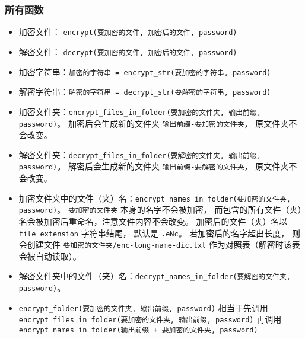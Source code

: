 \subsubsection{所有函数}
\begin{itemize}
\item 加密文件： \verb`encrypt(要加密的文件, 加密后的文件, password)`
\item 解密文件： \verb`decrypt(要加密的文件, 加密后的文件, password)`
\item 加密字符串：\verb`加密的字符串 = encrypt_str(要加密的字符串, password)`
\item 解密字符串：\verb`解密的字符串 = decrypt_str(要解密的字符串, password)`
\item 加密文件夹：\verb`encrypt_files_in_folder(要加密的文件夹, 输出前缀, password)`。 加密后会生成新的文件夹 \verb`输出前缀-要加密的文件夹`， 原文件夹不会改变。
\item 解密文件夹：\verb`decrypt_files_in_folder(要解密的文件夹, 输出前缀, password)`。 解密后会生成新的文件夹 \verb`输出前缀-要解密的文件夹`， 原文件夹不会改变。
\item 加密文件夹中的文件（夹）名：\verb`encrypt_names_in_folder(要加密的文件夹, password)`。 \verb`要加密的文件夹` 本身的名字不会被加密， 而包含的所有文件（夹）名会被加密后重命名，注意文件内容不会改变。 加密后的文件（夹）名以 \verb`file_extension` 字符串结尾， 默认是 \verb`.eNc`。 若加密后的名字超出长度， 则会创建文件 \verb`要加密的文件夹/enc-long-name-dic.txt` 作为对照表（解密时该表会被自动读取）。
\item 解密文件夹中的文件（夹）名：\verb`decrypt_names_in_folder(要解密的文件夹, password)`。
\item \verb`encrypt_folder(要加密的文件夹, 输出前缀, password)` 相当于先调用 \verb`encrypt_files_in_folder(要加密的文件夹, 输出前缀, password)` 再调用 \verb`encrypt_names_in_folder(输出前缀 + 要加密的文件夹, password)`
\end{itemize}
